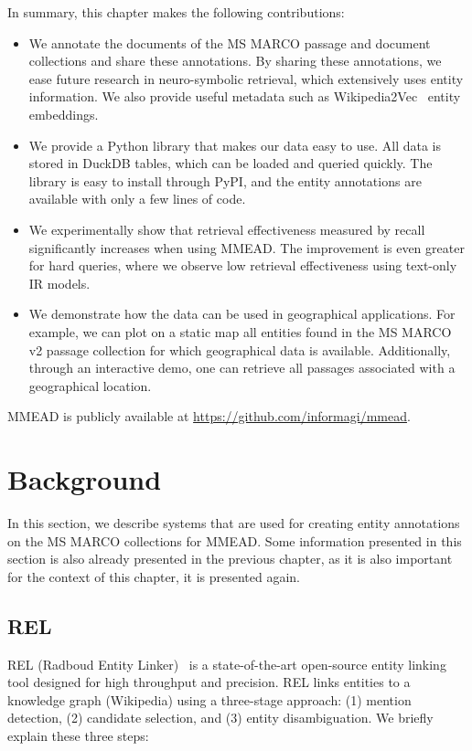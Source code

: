 In summary, this chapter makes the following contributions:
 \begin{itemize}
	\item We annotate the documents of the MS MARCO passage and document collections and share these annotations. By sharing these annotations, we ease future research in neuro-symbolic retrieval, which extensively uses entity information. We also provide useful metadata such as Wikipedia2Vec~\citep{wikipedia2vec} entity embeddings. 
	\item We provide a Python library that makes our data easy to use. All data is stored in DuckDB tables, which can be loaded and queried quickly. The library is easy to install through PyPI, and the entity annotations are available with only a few lines of code.
	\item We experimentally show that retrieval effectiveness measured by recall significantly increases when using MMEAD. The improvement is even greater for hard queries, where we observe low retrieval effectiveness using text-only IR models.
	\item We demonstrate how the data can be used in geographical applications. For example, we can plot on a static map all entities found in the MS MARCO v2 passage collection for which geographical data is available. Additionally, through an interactive demo, one can retrieve all passages associated with a geographical location.  
\end{itemize}

MMEAD is publicly available at \url{https://github.com/informagi/mmead}.

\section{Background}
In this section, we describe systems that are used for creating entity annotations on the MS MARCO collections for MMEAD. Some information presented in this section is also already presented in the previous chapter, as it is also important for the context of this chapter, it is presented again. 

\subsection{REL}
REL (Radboud Entity Linker)~\citep{rel} is a state-of-the-art open-source entity linking tool designed for high throughput and precision. REL links entities to a knowledge graph (Wikipedia) using a three-stage approach: (1) mention detection, (2) candidate selection, and (3) entity disambiguation. We briefly explain these three steps:

